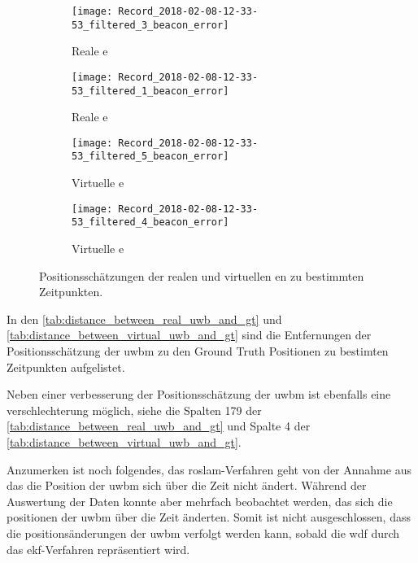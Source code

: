 \begin{figure}
	\centering
	\begin{subfigure}{0.49\linewidth}
		\centering
		\texttt{[image: Record\_2018-02-08-12-33-53\_filtered\_3\_beacon\_error]}
		\caption{Reale e}
		\label{fig:Record_2018-02-08-12-33-53_filtered_3_beacon_error}
	\end{subfigure}
	\hfill
	\begin{subfigure}{0.49\linewidth}
		\centering
		\texttt{[image: Record\_2018-02-08-12-33-53\_filtered\_1\_beacon\_error]}
		\caption{Reale e}
		\label{fig:Record_2018-02-08-12-33-53_filtered_1_beacon_error}
	\end{subfigure}
	\par
	\bigskip
	\begin{subfigure}{0.49\linewidth}
		\centering
		\texttt{[image: Record\_2018-02-08-12-33-53\_filtered\_5\_beacon\_error]}
		\caption{Virtuelle e}
		\label{fig:Record_2018-02-08-12-33-53_filtered_5_beacon_error}
	\end{subfigure}
	\hfill
	\begin{subfigure}{0.49\linewidth}
		\centering
		\texttt{[image: Record\_2018-02-08-12-33-53\_filtered\_4\_beacon\_error]}
		\caption{Virtuelle e}
		\label{fig:Record_2018-02-08-12-33-53_filtered_4_beacon_error}
	\end{subfigure}
	\caption{Positionsschätzungen der realen und virtuellen en zu bestimmten Zeitpunkten.}
	\label{fig:Record_2018-02-08-12-33-53_filtered_beacon_error}
\end{figure}

In den \autoref{tab:distance_between_real_uwb_and_gt} und \autoref{tab:distance_between_virtual_uwb_and_gt} sind die Entfernungen der Positionsschätzung der uwbm zu den Ground Truth Positionen zu bestimten Zeitpunkten aufgelistet. 

Neben einer verbesserung der Positionsschätzung der uwbm ist ebenfalls eine verschlechterung möglich, siehe die Spalten 179 der \autoref{tab:distance_between_real_uwb_and_gt} und Spalte 4 der \autoref{tab:distance_between_virtual_uwb_and_gt}.

Anzumerken ist noch folgendes, das roslam-Verfahren geht von der Annahme aus das die Position der uwbm sich über die Zeit nicht ändert. Während der Auswertung der Daten konnte aber mehrfach beobachtet werden, das sich die positionen der uwbm über die Zeit änderten. Somit ist nicht ausgeschlossen, dass die positionsänderungen der uwbm verfolgt werden kann, sobald die wdf durch das ekf-Verfahren repräsentiert wird.

